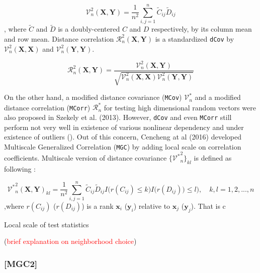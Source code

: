\documentclass[12pt]{article}
\theoremstyle{definition}
\begin{document}
\begin{equation}	 
\mathcal{V}^2_{n}(\boldsymbol{X}, \boldsymbol{Y}) = \frac{1}{n^2} \sum\limits_{i,j=1}^{n} \tilde{C}_{ij} \tilde{D}_{ij}
\end{equation}
, where $\tilde{C}$ and $\tilde{D}$ is a doubly-centered $C$ and $D$ respectively, by its column mean and row mean. Distance correlation $\mathcal{R}^{2}_{n}(\boldsymbol{X}, \boldsymbol{Y})$ is a standardized \texttt{dCov} by $\mathcal{V}^2_{n}(\boldsymbol{X}, \boldsymbol{X})$ and $\mathcal{V}^2_{n}(\boldsymbol{Y}, \boldsymbol{Y}).$

\begin{equation}	 
\mathcal{R}_{n}^{2} (\boldsymbol{X}, \boldsymbol{Y}) = \frac{\mathcal{V}^2_{n} (\boldsymbol{X}, \boldsymbol{Y}) }{\sqrt{\mathcal{V}^2_{n} (\boldsymbol{X}, \boldsymbol{X}) \mathcal{V}^2_{n} (\boldsymbol{Y}, \boldsymbol{Y}) } }
\end{equation}
	 
On the other hand, a modified distance covariance (\texttt{MCov}) $\mathcal{V}^*_{n}$ and a modified distance correlation (\texttt{MCorr}) $\mathcal{R}^{*}_{n}$ for testing high dimensional random vectors were also proposed in Szekely et al. (2013)\cite{Szekely2013}.   
However, \texttt{dCov} and even \texttt{MCorr} still perform not very well in existence of various nonlinear dependency and under existence of outliers (\cite{Cencheng}). Out of this concern, Cencheng at al (2016) \cite{Cencheng} developed Multiscale Generalized Correlation (\texttt{MGC}) by adding local scale on correlation coefficients. Multiscale version of distance covariance $\{ { {\mathcal{V}^{*}}^2_{n} }   \}_{kl}$ is defined as following : 
	
\begin{equation}
\label{MGC}
{\mathcal{V}^{*}}^2_{n} (\boldsymbol{X}, \boldsymbol{Y})_{kl} = \frac{1}{n^2} \sum\limits_{i,j=1}^{n} \tilde{C}_{ij} \tilde{D}_{ij} I \big( r(C_{ij}) \leq k \big) I \big( r(D_{ij})) \leq l  \big), \quad k,l=1,2,..., n 
\end{equation}
,where $r(C_{ij})$ ($r(D_{ij})$) is a rank $\mathbf{x}_{i}$ ($\mathbf{y}_{i}$) relative to $\mathbf{x}_{j}$ ($\mathbf{y}_{j}$). That is c 


Local scale of test statistics 



(\textcolor{red}{brief explanation on neighborhood choice})

\subsubsection{[MGC2]}
\end{document}
